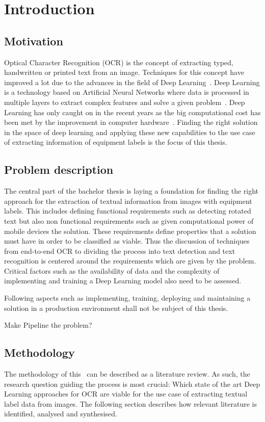 \chapter{Introduction}\label{ch:intro}
\section{Motivation}
Optical Character Recognition (OCR) is the concept of extracting typed, handwritten or printed text
from an image.
Techniques for this concept have improved a lot due to the advances in the field of Deep
Learning~\cite{zhao_improving_2020}.
Deep Learning is a technology based on Artificial Neural Networks where data is processed
in multiple layers to extract complex features and solve a given problem~\cite{shrestha_review_2019}.
Deep Learning has only caught on in the recent years as the big computational cost has been met
by the improvement in computer hardware~\cite{ponti_everything_2017}.
Finding the right solution in the space of deep learning and applying these new capabilities to
the use case of extracting information of equipment labels is the focus of this thesis.

\section{Problem description}\label{se:problem}
The central part of the bachelor thesis is laying a foundation for finding the right approach for
the extraction of textual information from images with equipment labels.
This includes defining functional requirements such as detecting rotated text but also non functional
requirements such as given computational power of mobile devices the solution.
These requirements define properties that a solution must have in order to be classified as viable.
Thus the discussion of techniques from end-to-end OCR to dividing the process into text detection and
text recognition is centered around the requirements which are given by the problem.
Critical factors such as the availability of data and the complexity of implementing and training a
Deep Learning model also need to be assessed.

Following aspects such as implementing, training, deploying and maintaining a solution in a
production environment shall not be subject of this thesis.

Make Pipeline the problem?

\section{Methodology}\label{se:methodology}
The methodology of this \the\arbeit\ can be described as a literature review.
As such, the research question guiding the process is most crucial: Which state of the art Deep
Learning approaches for OCR are viable for the use case of extracting textual label data from
images.
The following section describes how relevant literature is identified, analysed and synthesised.

